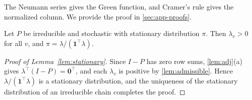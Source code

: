\documentclass[onefignum,onetabnum]{siamart250211}
\numberwithin{theorem}{section}
\numberwithin{equation}{section}
\newcommand{\one}{\mathbf{1}}
\newcommand{\zero}{\mathbf{0}}
\begin{document}
The Neumann series gives the Green function, and Cramer's rule gives
the normalized column. We provide the proof in \cref{sec:app-proofs}.

\begin{lemma}\label{lem:stationary}
Let $P$ be irreducible and stochastic with stationary distribution
$\pi$. Then $\lambda_v>0$ for all $v$, and
$\pi=\lambda/(\one^{\top}\lambda)$.
\end{lemma}

\begin{proof}[Proof of Lemma~\ref{lem:stationary}]
Since $I-P$ has zero row sums, \cref{lem:adj}(a) gives
$\lambda^{\top}(I-P)=\zero^{\top}$, and each $\lambda_v$ is positive by
\cref{lem:admissible}. Hence $\lambda/(\one^{\top}\lambda)$ is a
stationary distribution, and the uniqueness of the stationary
distribution of an irreducible chain \cite[Ch.~1]{LevinPeres2017}
completes the proof.
\end{proof}
\end{document}
